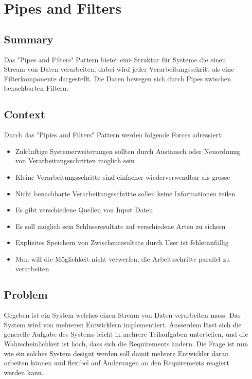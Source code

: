 \chapter{Pipes and Filters}

\section{Summary}
Das "Pipes and Filters" Pattern bietet eine Struktur für Systeme die einen Stream von Daten verarbeiten, dabei wird jeder Verarbeitungsschritt als eine Filterkomponente dargestellt. Die Daten bewegen sich durch Pipes zwischen benachbarten Filtern.  
\section{Context}
Durch das "Pipies and Filters" Pattern werden folgende Forces adressiert: 
\begin{itemize}
	\item Zukünftige Systemerweiterungen sollten durch Austausch oder Neuordnung von Verarbeitungsschritten möglich sein
	\item Kleine Verarbeitungsschritte sind einfacher wiederverwendbar als grosse
	\item Nicht benachbarte Verarbeitungsschritte sollen keine Informationen teilen
	\item Es gibt verschiedene Quellen von Input Daten
	\item Es soll möglich sein Schlussresultate auf verschiedene Arten zu sichern
	\item Explizites Speichern von Zwischenresultate durch User ist fehleranfällig
	\item Man will die Möglichkeit nicht verwerfen, die Arbeitsschritte parallel zu verarbeiten
\end{itemize}


\section{Problem}
Gegeben ist ein System welches einen Stream von Daten verarbeiten muss. Das System wird von mehreren Entwicklern implementiert. Ausserdem lässt sich die generelle Aufgabe des Systems leicht in mehrere Teilaufgaben unterteilen, und die Wahrscheinlichkeit ist hoch, dass sich die Requirements ändern. Die Frage ist nun wie ein solches System designt werden soll damit mehrere Entwickler daran arbeiten können und flexibel auf Änderungen an den Requirements reagiert werden kann.
